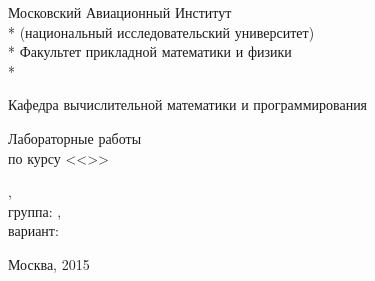 \documentclass[a4paper, 12pt]{report}
\begin{document}
\begin{titlepage}

\newpage

\begin{center}
Московский Авиационный Институт \\*
(национальный исследовательский университет) \\*
Факультет прикладной математики и физики \\*
\hrulefill
\end{center}

\begin{center}
Кафедра вычислительной математики и программирования
\end{center}

\vspace{6em}

\begin{center}
\Large Лабораторные работы \\
  по курсу <<\CourseName >>
\end{center}

\vspace{2em}
\vspace{6em}

\begin{flushright}
	\StudentName, \\
	группа: \Group, \\
  вариант: \TaskNum
\end{flushright}

\vspace{\fill}

\begin{center}
Москва, 2015
\end{center}

\end{titlepage}
\end{document}
